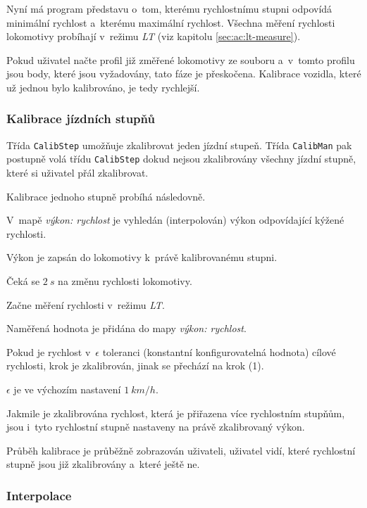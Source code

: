 Nyní má program představu o~tom, kterému rychlostnímu stupni odpovídá minimální
rychlost a~kterému maximální rychlost. Všechna měření rychlosti lokomotivy
probíhají v~režimu \textit{LT} (viz kapitolu \ref{sec:ac:lt-measure}).

Pokud uživatel načte profil již změřené lokomotivy ze souboru a~v~tomto profilu
jsou body, které jsou vyžadovány, tato fáze je přeskočena. Kalibrace vozidla,
které už jednou bylo kalibrováno, je tedy rychlejší.

\subsubsection{Kalibrace jízdních stupňů}

Třída \texttt{CalibStep} umožňuje zkalibrovat jeden jízdní stupeň. Třída
\texttt{CalibMan} pak postupně volá třídu \texttt{CalibStep} dokud nejsou
zkalibrovány všechny jízdní stupně, které si uživatel přál zkalibrovat.

Kalibrace jednoho stupně probíhá následovně.

\begin{compactenum}
\item V~mapě \textit{výkon: rychlost} je vyhledán (interpolován) výkon odpovídající
      kýžené rychlosti.
\item Výkon je zapsán do lokomotivy k~právě kalibrovanému stupni.
\item Čeká se $2\ s$ na změnu rychlosti lokomotivy.
\item Začne měření rychlosti v~režimu \textit{LT}.
\item Naměřená hodnota je přidána do mapy \textit{výkon: rychlost}.
\item Pokud je rychlost v~$\epsilon$ toleranci (konstantní konfigurovatelná hodnota)
      cílové rychlosti, krok je zkalibrován, jinak se přechází na krok (1).
\end{compactenum}

$\epsilon$ je ve výchozím nastavení $1\ km/h$.

Jakmile je zkalibrována rychlost, která je přiřazena více rychlostním stupňům,
jsou i~tyto rychlostní stupně nastaveny na právě zkalibrovaný výkon.

Průběh kalibrace je průběžně zobrazován uživateli, uživatel vidí, které
rychlostní stupně jsou již zkalibrovány a~které ještě ne.

\subsubsection{Interpolace}

